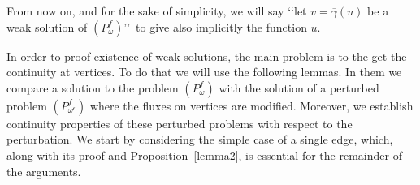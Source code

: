 \documentclass[reqno,12pt]{amsart}
\numberwithin{equation}{section} %
\begin{document}
 From now on, and for the sake of simplicity, we will say \lq\lq let $v=\overline{\gamma}(u)$ be a weak solution of $(P_{\omega}^f)$\rq\rq\ to give also implicitly the function $u$. 

 
 In order to proof existence of weak solutions, the main problem is to the get the continuity at vertices.   To do that we will use the following  lemmas. In them we compare a solution to the problem  $(P_{\omega}^f)$  with the solution of a perturbed problem $(P_{\omega^\epsilon}^f)$ where the   fluxes on vertices are modified. Moreover, we establish continuity properties of these perturbed problems with respect to the perturbation.
We start by considering the simple case of a single edge, which, along with its proof and Proposition~\ref{lemma2}, is essential for the remainder of the arguments. 
 
 
 
\end{document}
